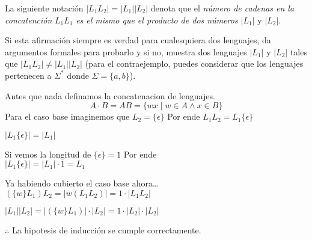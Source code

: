 \begin{questions}
\question La siguiente notaci\'on $|L_{1}L_{2}| = |L_{1}||L_{2}|$ denota que el {\it número de cadenas en la concatención}
$L_{1}L_{1}$ {\it es el mismo que el producto de dos n\'umeros $|L_{1}|$} y $|L_{2}|$.

Si esta afirmaci\'on siempre es verdad para cualesquiera dos lenguajes, da argumentos
formales para probarlo y si no, muestra dos lenguajes $|L_{1}|$ y $|L_{2}|$ tales que $|L_{1}L_{2}| \neq |L_{1}||L_{2}|$ (para el
contraejemplo, puedes considerar que los lenguajes pertenecen a $\Sigma^{*}$ donde $\Sigma = \{a,b\}$).

\begin{solution}
    Antes que nada definamos la concatenacion de lenguajes.
    \begin{equation}
        A \cdot B = AB = \{ wx \mid w \in A \wedge x \in B\}
    \end{equation}
    Para el caso base imaginemos que $L_{2} = \{\epsilon\}$ Por ende $L_{1}L_{2} = L_{1}\{\epsilon\}$

    $|L_{1}\{\epsilon\}| = |L_{1}|$ 

    Si vemos la longitud de $\{\epsilon\} = 1$ Por ende \\
    $|L_{1}\{\epsilon\}| = |L_{1}| \cdot 1 = L_{1}$

    Ya habiendo cubierto el caso base ahora\dots \\

    $(\{w\}L_{1})L_{2} = |{w}(L_{1}L_{2})| = 1 \cdot |L_{1}L_{2}|$

    $|L_{1}||L_{2}| = |(\{w\}L_{1})| \cdot |L_{2}| = 1 \cdot |L_{2}| \cdot |L_{2}|$

    $\therefore$ La hipotesis de inducci\'on se cumple correctamente.
    
\end{solution}
\end{questions}


